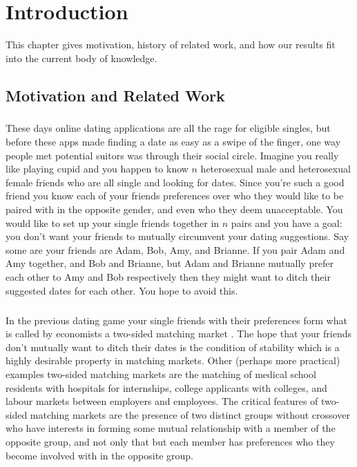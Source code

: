\chapter{Introduction}
This chapter gives motivation, history of related work, and how our results fit into the current body of knowledge.

\section{Motivation and Related Work}

\paragraph{}
These days online dating applications are all the rage for eligible singles, but before these apps made finding a date as easy as a swipe of the finger, one way people met potential suitors was through their social circle. Imagine you really like playing cupid and you happen to know $n$ heterosexual male and heterosexual female friends who are all single and looking for dates. Since you're such a good friend you know each of your friends preferences over who they would like to be paired with in the opposite gender, and even who they deem unacceptable. You would like to set up your single friends together in $n$ pairs and you have a goal: you don't want your friends to mutually circumvent your dating suggestions. Say some are your friends are Adam, Bob, Amy, and Brianne. If you pair Adam and Amy together, and Bob and Brianne, but Adam and Brianne mutually prefer each other to Amy and Bob respectively then they might want to ditch their suggested dates for each other. You hope to avoid this.
\paragraph{}
In the previous dating game your single friends with their preferences form what is called by economists a two-sided matching market \cite{roth1992two}. The hope that your friends don't mutually want to ditch their dates is the condition of stability which is a highly desirable property in matching markets. Other (perhaps more practical) examples two-sided matching markets are the matching of medical school residents with hospitals for internships, college applicants with colleges, and labour markets between employers and employees. The critical features of two-sided matching markets are the presence of two distinct groups without crossover who have interests in forming some mutual relationship with a member of the opposite group, and not only that but each member has preferences who they become involved with in the opposite group.

